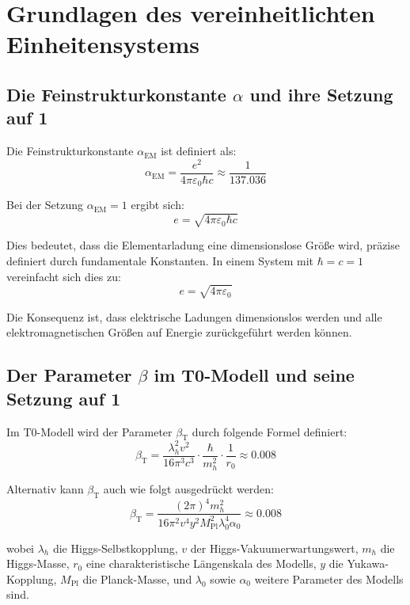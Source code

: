 \documentclass[12pt,a4paper]{article}
\newcommand{\alphaEM}{\alpha_{\text{EM}}}
\newcommand{\betaT}{\beta_{\text{T}}}
\newcommand{\Mpl}{M_{\text{Pl}}}
\begin{document}
	\section{Grundlagen des vereinheitlichten Einheitensystems}
	
	\subsection{Die Feinstrukturkonstante \(\alpha\) und ihre Setzung auf 1}
	
	Die Feinstrukturkonstante \(\alphaEM\) ist definiert als:
	\begin{equation}
		\alphaEM = \frac{e^2}{4\pi\varepsilon_0 \hbar c} \approx \frac{1}{137.036}
	\end{equation}
	
	Bei der Setzung \(\alphaEM = 1\) ergibt sich:
	\begin{equation}
		e = \sqrt{4\pi\varepsilon_0 \hbar c}
	\end{equation}
	
	Dies bedeutet, dass die Elementarladung eine dimensionslose Größe wird, präzise definiert durch fundamentale Konstanten. In einem System mit \(\hbar = c = 1\) vereinfacht sich dies zu:
	\begin{equation}
		e = \sqrt{4\pi\varepsilon_0}
	\end{equation}
	
	Die Konsequenz ist, dass elektrische Ladungen dimensionslos werden und alle elektromagnetischen Größen auf Energie zurückgeführt werden können.
	
	\subsection{Der Parameter \(\beta\) im T0-Modell und seine Setzung auf 1}
	
	Im T0-Modell wird der Parameter \(\betaT\) durch folgende Formel definiert:
	\begin{equation}
		\betaT = \frac{\lambda_h^2 v^2}{16\pi^3 c^3} \cdot \frac{\hbar}{m_h^2} \cdot \frac{1}{r_0} \approx 0.008
	\end{equation}
	
	Alternativ kann \(\betaT\) auch wie folgt ausgedrückt werden:
	\begin{equation}
		\betaT = \frac{(2\pi)^4 m_h^2}{16 \pi^2 v^4 y^2 \Mpl^2 \lambda_0^4 \alpha_0} \approx 0.008
	\end{equation}
	
	wobei \(\lambda_h\) die Higgs-Selbstkopplung, \(v\) der Higgs-Vakuumerwartungswert, \(m_h\) die Higgs-Masse, \(r_0\) eine charakteristische Längenskala des Modells, \(y\) die Yukawa-Kopplung, \(\Mpl\) die Planck-Masse, und \(\lambda_0\) sowie \(\alpha_0\) weitere Parameter des Modells sind.
	
\end{document}
